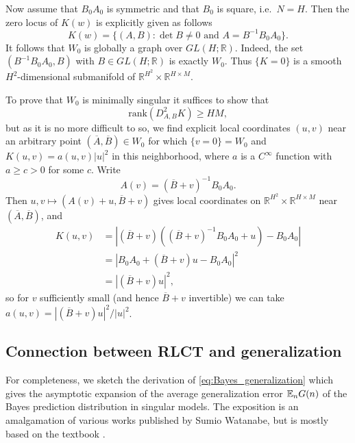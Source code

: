 \documentclass{article} %
\begin{document}
Now assume that $B_0A_0$ is symmetric and that $B_0$ is square,
i.e.\ $N = H$.  Then the zero locus of $K(w)$ is explicitly given as
follows
$$
K(w) = \{ (A, B) : \det B \neq 0 \mbox{ and } A = B^{-1}B_0A_0 \}.
$$
It follows that $W_0$ is globally a graph over $GL(H;
\mathbb{R})$.  Indeed, the set $(B^{-1}B_0 A_0, B)$ with $B \in GL(H;
\mathbb{R})$ is exactly $W_0$.  Thus $\{ K = 0\}$ is a smooth
$H^2$-dimensional submanifold of $\mathbb{R}^{H^2} \times
\mathbb{R}^{H \times M}$.  

To prove that $W_0$ is minimally singular it suffices to show that
$$
\mathrm{rank} ( D^2_{A,B}K) \ge HM,
$$
but as it is no more difficult to so, we find explicit local
coordinates $(u, v)$ near an arbitrary point $(\overline{A},
\overline{B}) \in W_0$ for which $\{ v = 0 \} = W_0$
and $K(u, v) = a(u,v)|u|^2$ in this neighborhood, where $a$ is a
$C^\infty$ function with $a \ge c > 0$ for some $c$.  Write
$$
A(v) = (\overline{B} + v)^{-1}B_0 A_0.
$$
Then $u, v \mapsto (A(v) + u, \overline{B} + v)$ gives local
coordinates on $\mathbb{R}^{H^2} \times
\mathbb{R}^{H \times M}$ near $(\overline{A}, \overline{B})$, and
\begin{equation*}
\begin{split}
K(u, v) &= | (\overline{B} + v)( (\overline{B} + v)^{-1}B_0 A_0 + u) -
B_0 A_0 | \\
&= | B_0 A_0 +  (\overline{B} + v) u -
B_0 A_0 |^2 \\
&= | (\overline{B} + v) u |^2,
\end{split}
\end{equation*}
so for $v$ sufficiently small (and hence $\overline{B} + v$
invertible) we can take $a(u,v) = | (\overline{B} + v) u |^2 /
|u|^2$.  




\subsection{Connection between RLCT and generalization} \label{appendix:generalization_theory}
For completeness, we sketch the derivation of \eqref{eq:Bayes_generalization} which gives the asymptotic expansion of the average generalization error ${\mathbb{E}}_n G(n)$ of the Bayes prediction distribution  in singular models. The exposition is an amalgamation of various works published by Sumio Watanabe, but is mostly based on the textbook \cite{watanabe_algebraic_2009}. 
\end{document}
